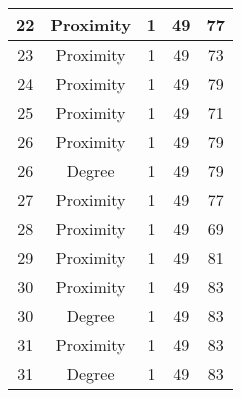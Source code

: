 \documentclass[results.tex]{subfiles}
\begin{document}
\begin{center}
\begin{tabular}{| c || c | c | c | c |}
            \hline
            22                      & Proximity                    & 1                      & 49                      & 77                   \\
            \hline
            23                      & Proximity                    & 1                      & 49                      & 73                   \\
            \hline
            24                      & Proximity                    & 1                      & 49                      & 79                   \\
            \hline
            25                      & Proximity                    & 1                      & 49                      & 71                   \\
            \hline
            26                      & Proximity                    & 1                      & 49                      & 79                   \\
            \hline
            26                      & Degree                       & 1                      & 49                      & 79                   \\
            \hline
            27                      & Proximity                    & 1                      & 49                      & 77                   \\
            \hline
            28                      & Proximity                    & 1                      & 49                      & 69                   \\
            \hline
            29                      & Proximity                    & 1                      & 49                      & 81                   \\
            \hline
            30                      & Proximity                    & 1                      & 49                      & 83                   \\
            \hline
            30                      & Degree                       & 1                      & 49                      & 83                   \\
            \hline
            31                      & Proximity                    & 1                      & 49                      & 83                   \\
            \hline
            31                      & Degree                       & 1                      & 49                      & 83                   \\

\end{tabular}
\end{center}
\end{document}
